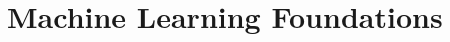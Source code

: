 \chapter{Machine Learning Foundations}
\label{chapter:machine-learning-foundations}
\thispagestyle{empty}




% 